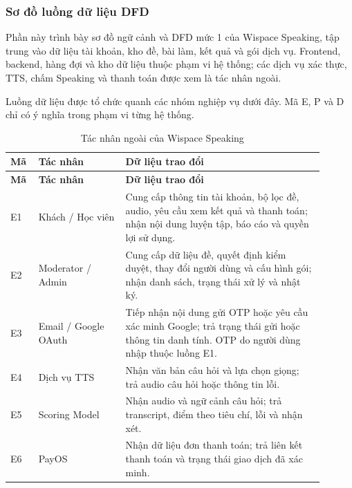 \clearpage
\subsubsection{Sơ đồ luồng dữ liệu DFD}
\label{wispace:sec:dfd}

Phần này trình bày sơ đồ ngữ cảnh và DFD mức 1 của Wispace Speaking, tập trung vào dữ liệu tài khoản, kho đề, bài làm, kết quả và gói dịch vụ. Frontend, backend, hàng đợi và kho dữ liệu thuộc phạm vi hệ thống; các dịch vụ xác thực, TTS, chấm Speaking và thanh toán được xem là tác nhân ngoài.

Luồng dữ liệu được tổ chức quanh các nhóm nghiệp vụ dưới đây. Mã E, P và D chỉ có ý nghĩa trong phạm vi từng hệ thống.

\begin{longtable}{|>{\raggedright\arraybackslash}p{0.07\linewidth}|>{\raggedright\arraybackslash}p{0.25\linewidth}|p{0.58\linewidth}|}
\caption{Tác nhân ngoài của Wispace Speaking}\label{wispace:tab:dfd-entities}\\
\hline
\textbf{Mã} & \textbf{Tác nhân} & \textbf{Dữ liệu trao đổi} \\
\hline
\endfirsthead
\hline
\textbf{Mã} & \textbf{Tác nhân} & \textbf{Dữ liệu trao đổi} \\
\hline
\endhead
E1 & Khách / Học viên & Cung cấp thông tin tài khoản, bộ lọc đề, audio, yêu cầu xem kết quả và thanh toán; nhận nội dung luyện tập, báo cáo và quyền lợi sử dụng. \\
\hline
E2 & Moderator / Admin & Cung cấp dữ liệu đề, quyết định kiểm duyệt, thay đổi người dùng và cấu hình gói; nhận danh sách, trạng thái xử lý và nhật ký. \\
\hline
E3 & Email / Google OAuth & Tiếp nhận nội dung gửi OTP hoặc yêu cầu xác minh Google; trả trạng thái gửi hoặc thông tin danh tính. OTP do người dùng nhập thuộc luồng E1. \\
\hline
E4 & Dịch vụ TTS & Nhận văn bản câu hỏi và lựa chọn giọng; trả audio câu hỏi hoặc thông tin lỗi. \\
\hline
E5 & Scoring Model & Nhận audio và ngữ cảnh câu hỏi; trả transcript, điểm theo tiêu chí, lỗi và nhận xét. \\
\hline
E6 & PayOS & Nhận dữ liệu đơn thanh toán; trả liên kết thanh toán và trạng thái giao dịch đã xác minh. \\
\hline
\end{longtable}


